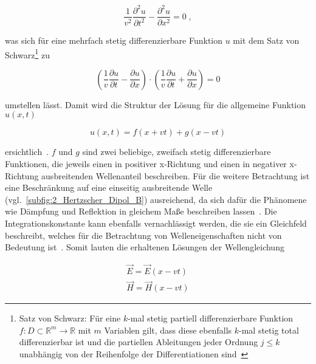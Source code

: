 \begin{equation}
    \frac{1}{v^2}\frac{\partial^2 u}{\partial t^2} - \frac{\partial^2 u}{\partial x^2} = 0 \; ,
\end{equation}

was sich für eine mehrfach stetig differenzierbare Funktion $u$ mit dem Satz von Schwarz\footnote{Satz von Schwarz: Für eine $k$-mal stetig partiell differenzierbare Funktion $f : D \subset \mathbb{R}^m \to \mathbb{R}$ mit $m$ Variablen gilt, dass diese ebenfalls $k$-mal stetig total differenzierbar ist und die partiellen Ableitungen jeder Ordnung $j \leq k$ unabhängig von der Reihenfolge der Differentiationen sind~\cite{Vorlesung_Ingenieursmathematik}} zu

\begin{equation}
    \left(\frac{1}{v} \frac{\partial u}{\partial t} - \frac{\partial u}{\partial x}\right) \cdot \left(\frac{1}{v} \frac{\partial u}{\partial t} + \frac{\partial u}{\partial x}\right) = 0
\end{equation}

umstellen lässt. Damit wird die Struktur der Lösung für die allgemeine Funktion $u(x,t)$ 

\begin{equation}
    u(x,t) = f(x+vt) + g(x-vt)
\end{equation}

ersichtlich~\cite{Methoden_physikalischer_Mathematik_Band_2}. $f$ und $g$ sind zwei beliebige, zweifach stetig differenzierbare Funktionen, die jeweils einen in positiver x-Richtung und einen in negativer x-Richtung ausbreitenden Wellenanteil beschreiben. Für die weitere Betrachtung ist eine Beschränkung auf eine einseitig ausbreitende Welle (vgl.~\Abb \ref{subfig:2_Hertzscher_Dipol_B}) ausreichend, da sich dafür die Phänomene wie Dämpfung und Reflektion in gleichem Maße beschreiben lassen~\cite{EM_Schirmung}. Die Integrationskonstante kann ebenfalls vernachlässigt werden, die sie ein Gleichfeld beschreibt, welches für die Betrachtung von Welleneigenschaften nicht von Bedeutung ist~\cite{EM_Schirmung}. Somit lauten die erhaltenen Lösungen der Wellengleichung

\begin{subequations}
    \begin{align}
        \vec E = \vec E(x-vt) \\
        \vec H = \vec H(x-vt)
    \end{align}
\end{subequations}

